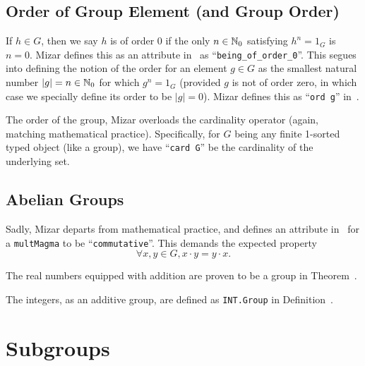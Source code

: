 {\subsection{Order of Group Element (and Group Order)}
If $h\in G$, then we say $h$ is of order 0 if the only $n\in\mathbb{N}_{0}$
satisfying $h^{n}=1_{G}$ is $n=0$. Mizar defines this as an attribute
in~ as ``\verb#being_of_order_0#''.
This segues into defining the notion of the order for an element $g\in G$
as the smallest natural number $|g|=n\in\mathbb{N}_{0}$ for which $g^{n}=1_{G}$
(provided $g$ is not of order zero, in which case we specially define
its order to be $|g|=0$). Mizar defines this as
``\verb#ord g#''
in~.

The order of the group, Mizar overloads the cardinality operator (again,
matching mathematical practice). Specifically,
for $G$ being any finite 1-sorted typed object (like a group), we have
``\verb#card G#'' be the cardinality
of the underlying set.

\subsection{Abelian Groups}
Sadly, Mizar departs from mathematical practice, and defines an
attribute in~ for a \verb#multMagma# to be
``\verb#commutative#''.
This demands the expected property
\begin{equation*}
  \forall x,y\in G, x\cdot y=y\cdot x.
\end{equation*}

\begin{example}
  The real numbers equipped with addition are proven to be a group in
  Theorem~.
\end{example}

\begin{example}
The integers, as an additive group, are defined as \lstinline|INT.Group|
in Definition~.
\end{example}

\section{Subgroups}

}
